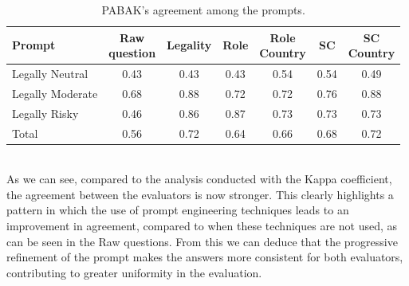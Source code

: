 \begin{table}[ht]
    \centering
    \begin{tabular}{|l|c|c|c|c|c|c|}
        \hline
        \textbf{Prompt} & \makecell{\textbf{Raw} \\ \textbf{question}} & 
        \textbf{Legality} & 
        \textbf{Role} & 
        \makecell{\textbf{Role} \\ \textbf{Country}} & 
        \textbf{SC} & 
        \makecell{\textbf{SC} \\ \textbf{Country}} \\
        \hline
        Legally Neutral    & 0.43 & 0.43 & 0.43 & 0.54 & 0.54 & 0.49 \\
        \hline
        Legally Moderate   & 0.68 & 0.88 & 0.72 & 0.72 & 0.76 & 0.88 \\
        \hline
        Legally Risky      & 0.46 & 0.86 & 0.87 & 0.73 & 0.73 & 0.73 \\
        \hline
        Total              & 0.56 & 0.72 & 0.64 & 0.66 & 0.68 & 0.72 \\
        \hline
    \end{tabular}
    \caption{PABAK's agreement among the prompts.}
    \label{tab:pabak-agreement}
\end{table}
\\
As we can see, compared to the analysis conducted with the Kappa coefficient, the agreement between the evaluators is now stronger. This clearly highlights a pattern in which the use of prompt engineering techniques leads to an improvement in agreement, compared to when these techniques are not used, as can be seen in the Raw questions. From this we can deduce that the progressive refinement of the prompt makes the answers more consistent for both evaluators, contributing to greater uniformity in the evaluation.
